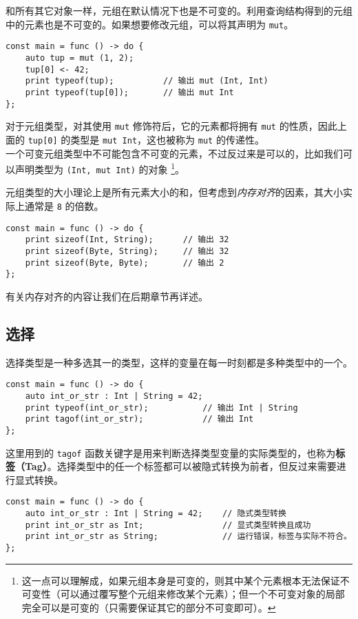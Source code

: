 和所有其它对象一样，元组在默认情况下也是不可变的。利用查询结构得到的元组中的元素也是不可变的。如果想要修改元组，可以将其声明为 \lstinline!mut!。

\begin{lstlisting}
const main = func () -> do {
	auto tup = mut (1, 2);
	tup[0] <- 42;
	print typeof(tup);			// 输出 mut (Int, Int)
	print typeof(tup[0]);		// 输出 mut Int
};
\end{lstlisting}

对于元组类型，对其使用 \lstinline!mut! 修饰符后，它的元素都将拥有 \lstinline!mut! 的性质，因此上面的 \lstinline!tup[0]! 的类型是 \lstinline!mut Int!，这也被称为 \lstinline!mut! 的传递性。 \\

一个可变元组类型中不可能包含不可变的元素，不过反过来是可以的，比如我们可以声明类型为 \lstinline!(Int, mut Int)! 的对象 \footnote{这一点可以理解成，如果元组本身是可变的，则其中某个元素根本无法保证不可变性（可以通过覆写整个元组来修改某个元素）；但一个不可变对象的局部完全可以是可变的（只需要保证其它的部分不可变即可）。}。

元组类型的大小理论上是所有元素大小的和，但考虑到\emph{内存对齐}的因素，其大小实际上通常是 \lstinline!8! 的倍数。

\begin{lstlisting}
const main = func () -> do {
    print sizeof(Int, String);      // 输出 32
    print sizeof(Byte, String);     // 输出 32
    print sizeof(Byte, Byte);       // 输出 2
};
\end{lstlisting}

有关内存对齐的内容让我们在后期章节再详述。

\subsection{选择}

选择类型是一种多选其一的类型，这样的变量在每一时刻都是多种类型中的一个。

\begin{lstlisting}
const main = func () -> do {
    auto int_or_str : Int | String = 42;
    print typeof(int_or_str);           // 输出 Int | String
    print tagof(int_or_str);            // 输出 Int
};
\end{lstlisting}

这里用到的 \lstinline!tagof! 函数关键字是用来判断选择类型变量的实际类型的，也称为\textbf{标签（Tag）}。选择类型中的任一个标签都可以被隐式转换为前者，但反过来需要进行显式转换。

\begin{lstlisting}
const main = func () -> do {
    auto int_or_str : Int | String = 42;    // 隐式类型转换
    print int_or_str as Int;                // 显式类型转换且成功
    print int_or_str as String;             // 运行错误，标签与实际不符合。
};
\end{lstlisting}

